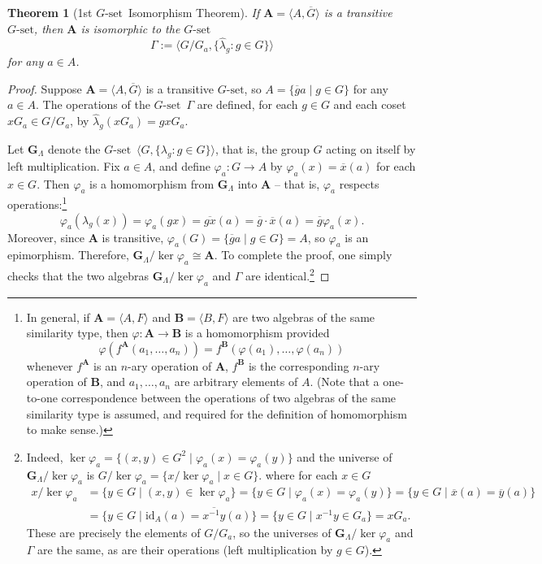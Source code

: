 \documentclass[cm,dissertation,actual,final]{uhthesis}
\theoremstyle{plain}
\newtheorem{theorem}{Theorem}[section]
\theoremstyle{definition}
\theoremstyle{remark}
\numberwithin{theorem}{section}
\numberwithin{claim}{chapter}
\numberwithin{equation}{section}
\numberwithin{conjecture}{chapter}
\newcommand{\<}{\ensuremath{\langle}}
\renewcommand{\>}{\ensuremath{\rangle}}
\newcommand{\0}{\ensuremath{\mathbf{0}}}
\newcommand{\1}{\ensuremath{\mathbf{1}}}
\newcommand{\2}{\ensuremath{\mathbf{2}}}
\newcommand{\3}{\ensuremath{\mathbf{3}}}
\newcommand{\4}{\ensuremath{\mathbf{4}}}
\newcommand{\5}{\ensuremath{\mathbf{5}}}
\newcommand{\bA}{\ensuremath{\mathbf{A}}}
\newcommand{\bB}{\ensuremath{\mathbf{B}}}
\newcommand{\bG}{\ensuremath{\mathbf{G}}}
\newcommand{\barG}{\ensuremath{\overline{G}}}
\newcommand{\barg}{\ensuremath{\overline{g}}}
\newcommand{\barx}{\ensuremath{\overline{x}}}
\newcommand{\bary}{\ensuremath{\overline{y}}}
\newcommand{\stab}[1]{\ensuremath{G_{#1}}}
\newcommand{\Gset}{\ensuremath{G\text{-set}}}
\newcommand{\id}{\ensuremath{\mathrm{id}}}
\begin{document}
\begin{theorem}[1st \Gset\ Isomorphism Theorem]
\label{thm:g-set-isomorphism1}
  If $\bA = \<A, \barG\>$ is a transitive \Gset, then $\bA$ is
  isomorphic to the \Gset 
  \[
  \Gamma :=  \<G/\stab{a}, \{\hat{\lambda}_g : g\in G\}\>
  \]
  for any $a\in A$.
\end{theorem}
\begin{proof}
  Suppose $\bA= \<A, \barG\>$ is a transitive \Gset, so 
  $A = \{\barg a \mid  g\in G\}$ for any $a\in A$.  The operations of the \Gset\ $\Gamma$ are defined, for each $g\in G$ and each
  coset $x \stab{a}\in G/\stab{a}$, by $\hat{\lambda}_g(x \stab{a}) = gx\stab{a}$. 

  Let 
  $\bG_\Lambda$ denote the \Gset\ $\<G, \{\lambda_g : g\in G\}\>$, that is,
  the group $G$ acting on itself by left multiplication. 
  Fix $a\in A$, and define $\varphi_a:G \rightarrow A$ by $\varphi_a(x) =
  \barx(a)$ for 
  each $x\in G$.  
  Then $\varphi_a$ is a homomorphism
  from 
  $\bG_\Lambda$ 
  into $\bA$ --
  that is, $\varphi_a$ respects operations:\footnote{In general, if $\bA
    =\< A, F\>$ and $\bB = \<B, F\>$ are two algebras of the same
    similarity type, then   
    $\varphi: \bA \rightarrow \bB$ is a homomorphism provided
    \[
    \varphi(f^\bA(a_1,\dots, a_n)) = f^\bB(\varphi(a_1),\dots,\varphi(a_n))
    \]
    whenever $f^\bA$ is an $n$-ary operation of $\bA$, $f^\bB$ is the
    corresponding $n$-ary operation of $\bB$, and $a_1,\dots, a_n$ are arbitrary 
    elements of $A$.  (Note that a one-to-one correspondence between the
    operations of 
    two algebras of the same similarity type is assumed, and required for the
    definition 
    of homomorphism to make sense.)
  }
  \[
  \varphi_a(\lambda_g(x)) = \varphi_a(gx)= \overline{gx}(a)
  = \barg \cdot \barx(a)
  = \barg \varphi_a(x).
  \]
  Moreover, since $\bA$ is transitive, $\varphi_a(G) = \{\barg a \mid  g\in G\}
  = A$, 
  so $\varphi_a$ is an epimorphism.  Therefore,
  $\bG_\Lambda/\ker \varphi_a \cong \bA$.  
  To complete the proof, one simply checks that the two algebras $\bG_\Lambda
  /\ker \varphi_a $ and $\Gamma$ are identical.\footnote{
    Indeed, 
    $\ker \varphi_a = \{(x,y) \in G^2 \mid  \varphi_a(x) = \varphi_a(y)\}$
    and the  universe of $\bG_\Lambda /\ker \varphi_a$ is 
    $G/\ker \varphi_a = \{x/\ker \varphi_a  \mid x\in G \}$. 
     where for each $x\in G$
  \begin{align*}
    x/\ker \varphi_a &= \{y\in G  \mid  (x,y) \in \ker \varphi_a\}
    = \{y\in G  \mid  \varphi_a(x) = \varphi_a(y)\}
    = \{y\in G  \mid  \barx(a) = \bary(a)\}\\
    &= \{y\in G  \mid  \id_{A}(a) = \overline{x^{-1}y}(a)\}
    = \{y\in G  \mid  x^{-1}y \in \stab{a}\}
    = x \stab{a}.
  \end{align*}
  These are precisely the elements of $G/\stab{a}$,
  so the universes of $\bG_\Lambda /\ker \varphi_a$ and $\Gamma$ are
  the same, as are their operations (left multiplication by $g\in G$).}
\end{proof}
\end{document}

